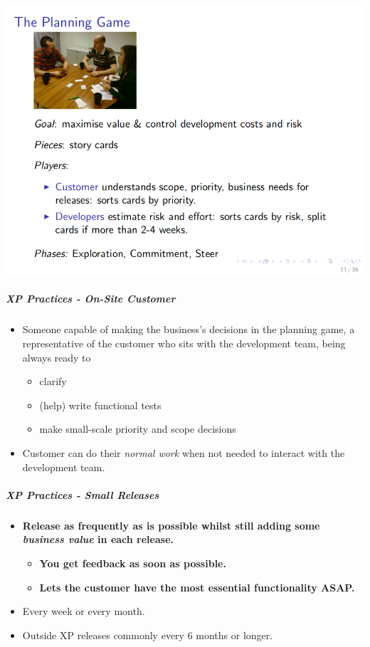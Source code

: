 \documentclass[a4paper]{article}
\providecommand{\tightlist}{%
  \setlength{\itemsep}{0pt}\setlength{\parskip}{0pt}}
\let\oldsubparagraph\subparagraph
\renewcommand{\subparagraph}[1]{\oldsubparagraph{#1}\mbox{}}
\begin{document}
\includegraphics{2C-SE.assets/1543147264443.png}

\hypertarget{xp-practices---on-site-customer}{%
\subparagraph{XP Practices - On-Site
Customer}\label{xp-practices---on-site-customer}}

\begin{itemize}
\tightlist
\item
  Someone capable of making the business's decisions in the planning
  game, a representative of the customer who sits with the development
  team, being always ready to

  \begin{itemize}
  \tightlist
  \item
    clarify
  \item
    (help) write functional tests
  \item
    make small-scale priority and scope decisions
  \end{itemize}
\item
  Customer can do their \emph{normal work} when not needed to interact
  with the development team.
\end{itemize}

\hypertarget{xp-practices---small-releases}{%
\subparagraph{XP Practices - Small
Releases}\label{xp-practices---small-releases}}

\begin{itemize}
\tightlist
\item
  \textbf{Release as frequently as is possible whilst still adding some
  \emph{business value} in each release.}

  \begin{itemize}
  \tightlist
  \item
    \textbf{You get feedback as soon as possible.}
  \item
    \textbf{Lets the customer have the most essential functionality
    ASAP.}
  \end{itemize}
\item
  Every week or every month.
\item
  Outside XP releases commonly every 6 months or longer.
\end{itemize}
\end{document}
